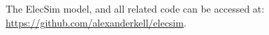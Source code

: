 The ElecSim model, and all related code can be accessed at: \url{https://github.com/alexanderkell/elecsim}.


%
%
%
%
%	
%	
%	
%	
%	
%	
%	
%	
%	
%	
%	
%	
%	
%
%




